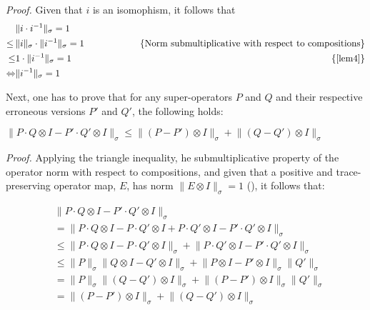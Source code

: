 \textit{Proof.} \quad Given that $i$ is an isomophism, it follows that 
\begin{equation} 
  \begin{split}
    &\lVert i \cdot i^{-1}  \rVert_{\sigma} = 1  \\
    \leq \hspace{2pt}& \lVert i  \rVert_{\sigma} \cdot \lVert i^{-1}  \rVert_{\sigma} = 1 \hspace{50pt} & \text{\{Norm submultiplicative with respect to compositions\}} \\
    \leq & 1 \cdot \lVert i^{-1}  \rVert_{\sigma} = 1 & \text{\{\autoref{lem4}\}}  \\
    \Leftrightarrow &  \lVert i^{-1}  \rVert_{\sigma} = 1  \\
  \end{split}   
  \end{equation}




Next, one has to prove that for any super-operators $P$ and $Q$ and their respective erroneous versions $P'$ and $Q'$, the following holds:
  \begin{lemma} \label {lemmasum}
    $  \lVert P\cdot Q \otimes I - P'\cdot Q'  \otimes I \rVert_{\sigma} \leq  \lVert (P - P') \otimes I  \rVert_{\sigma} + \lVert (Q - Q') \otimes I \rVert_{\sigma}   $
  \end{lemma} 
  
  \textit{Proof.} \quad Applying the triangle inequality, he submultiplicative property of the operator norm with respect to compositions, and given that a positive and trace-preserving operator map, $E$, has norm $\lVert E \otimes I  \rVert_{\sigma} =1$ (\cite{watrous2018theory}), it follows that:
  
  \begin{equation}
    \begin{split}
      & \lVert P\cdot Q \otimes I - P'\cdot Q' \otimes I  \rVert_{\sigma}  \\
      &= \lVert  P\cdot Q \otimes I- P\cdot Q' \otimes I + P\cdot Q' \otimes I - P'\cdot Q' \otimes I  \rVert_{\sigma}  \\
      &\leq \lVert P\cdot Q \otimes I - P\cdot Q' \otimes I  \rVert_{\sigma} + \lVert P\cdot Q' \otimes I - P'\cdot Q' \otimes I  \rVert_{\sigma}  \\
      &\leq \lVert P \rVert_{\sigma} \lVert Q \otimes I - Q' \otimes I  \rVert_{\sigma} + \lVert P \otimes I - P' \otimes I  \rVert_{\sigma} \lVert Q'  \rVert_{\sigma}  \\
      &= \lVert P \rVert_{\sigma} \lVert (Q  - Q') \otimes I  \rVert_{\sigma} + \lVert (P  - P') \otimes I  \rVert_{\sigma} \lVert Q'  \rVert_{\sigma}  \\
      &= \lVert (P - P') \otimes I  \rVert_{\sigma} + \lVert (Q - Q') \otimes I  \rVert_{\sigma}  \\
    \end{split}
    \end{equation}

